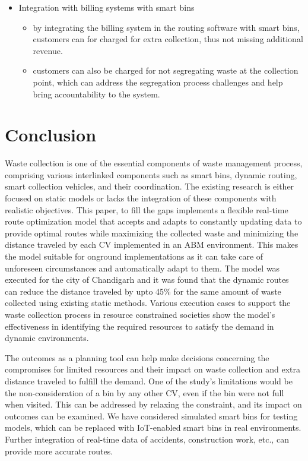 \documentclass[12pt]{article}
\begin{document}
\begin{itemize}
\begin{itemize}
\begin{itemize}
 \end{itemize}
 \item Integration with billing systems with smart bins
   \begin{itemize}
 \item by integrating the billing system in the routing software with smart bins, customers can for charged for extra collection, thus not missing additional revenue. \item customers can also be charged for not segregating waste at the collection point, which can address the segregation process challenges and help bring accountability to the system.

\end{itemize}
\end{itemize}
\end{itemize}
\section{Conclusion}
Waste collection is one of the essential components of waste management process, comprising various interlinked components such as smart bins, dynamic routing, smart collection vehicles, and their coordination. The existing research is either focused on static models or lacks the integration of these components with realistic objectives. This paper, to fill the gaps implements a flexible real-time route optimization model that accepts and adapts to constantly updating data to provide optimal routes while maximizing the collected waste and minimizing the distance traveled by each CV implemented in an ABM environment. This makes the model suitable for onground implementations as it can take care of unforeseen circumstances and automatically adapt to them. The model was executed for the city of Chandigarh and it was found that the dynamic routes can reduce the distance traveled by upto 45\% for the same amount of waste collected using existing static methods. Various execution cases to support the waste collection process in resource constrained societies show the model's effectiveness in identifying the required resources to satisfy the demand in dynamic environments. 

The outcomes as a planning tool can help make decisions concerning the compromises for limited resources and their impact on waste collection and extra distance traveled to fulfill the demand. One of the study's limitations would be the non-consideration of a bin by any other CV, even if the bin were not full when visited. This can be addressed by relaxing the constraint, and its impact on outcomes can be examined. We have considered simulated smart bins for testing models, which can be replaced with IoT-enabled smart bins in real environments. Further integration of real-time data of accidents, construction work, etc., can provide more accurate routes.
\end{document}
